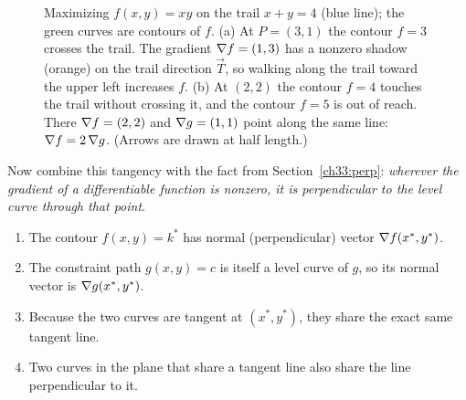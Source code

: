\begin{figure}[htbp]
\caption{Maximizing $f(x,y)=xy$ on the trail $x+y=4$ (blue line); the green curves are
contours of $f$. (a) At $P=(3,1)$ the contour $f=3$ crosses the trail. The gradient
$\nabla f=(1,3)$ has a nonzero shadow (orange) on the trail direction $\vec T$, so
walking along the trail toward the upper left increases $f$. (b) At $(2,2)$ the
contour $f=4$ touches the trail without crossing it, and the contour $f=5$ is out
of reach. There $\nabla f=(2,2)$ and $\nabla g=(1,1)$ point along the same line:
$\nabla f=2\,\nabla g$. (Arrows are drawn at half length.)}
\label{ch33:fig-lagrange-kiss}
\end{figure}

Now combine this tangency with the fact from Section~\ref{ch33:perp}: \emph{wherever the gradient of a differentiable function is nonzero, it is perpendicular to the level curve through that point}.
\begin{enumerate}
\item The contour $f(x,y) = k^*$ has normal (perpendicular) vector $\nabla f(x^*, y^*)$.
\item The constraint path $g(x,y) = c$ is itself a level curve of $g$, so its normal vector is $\nabla g(x^*, y^*)$.
\item Because the two curves are tangent at $(x^*, y^*)$, they share the exact same tangent line.
\item Two curves in the plane that share a tangent line also share the line perpendicular to it.
\end{enumerate}

